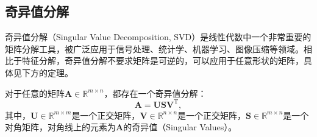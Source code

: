 \subsection{奇异值分解}

奇异值分解（Singular Value Decomposition, SVD）是线性代数中一个非常重要的矩阵分解工具，被广泛应用于信号处理、统计学、机器学习、图像压缩等领域。相比于特征分解，奇异值分解不要求矩阵是可逆的，可以应用于任意形状的矩阵，具体见下方的定理。

\begin{theorem}
    对于任意的矩阵\( \mathbf{A} \in \mathbb{R}^{m \times n} \)，都存在一个奇异值分解：
    \[
        \mathbf{A} = \mathbf{U} \mathbf{S} \mathbf{V}^{\mathrm{T}},
    \]
    其中，\( \mathbf{U} \in \mathbb{R}^{m \times m} \)是一个正交矩阵，\( \mathbf{V} \in \mathbb{R}^{n \times n} \)是一个正交矩阵，\( \mathbf{S} \in \mathbb{R}^{m \times n} \)是一个对角矩阵，对角线上的元素为\( \mathbf{A} \)的奇异值（Singular Values）。
\end{theorem}

